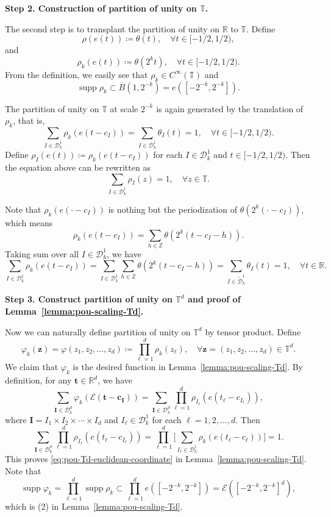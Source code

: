 \documentclass[12pt]{amsart}
\theoremstyle{definition}
\theoremstyle{remark}
\newcommand{\bt}{\boldsymbol{t}}
\newcommand{\bz}{\boldsymbol{z}}
\newcommand{\R}{\mathbb{R}}
\newcommand{\Z}{\mathbb{Z}}
\newcommand{\T}{\mathbb{T}}
\newcommand{\supp}{\operatorname{supp}}
\numberwithin{equation}{section}
\begin{document}
\medskip
{\flushleft \bf Step 2. Construction of partition of unity on $\T$.}
\medskip

The second step is to transplant the partition of unity on $\R$ to $\T$. Define 
\[
\rho(e(t))\coloneq \theta(t),\quad \forall t\in [-1/2,1/2),
\]
and
\[
\rho_k(e(t))\coloneq \theta(2^k t),\quad \forall t\in [-1/2,1/2).
\]
From the definition, we easily see that $\rho_k\in C^\infty(\T)$ and
\[
\supp \rho_k\subset \overline{B}(1,2^{-k})=e([-2^{-k},2^{-k}]).
\]

The partition of unity on $\T$ at scale $2^{-k}$ is again generated by the translation of $\rho_k$, that is,
\[
\sum_{I\in \mathscr{D}_k^1} \rho_k(e(t-c_I))=\sum_{I\in \mathscr{D}_k^1} \theta_{I}(t)=1,\quad \forall t\in [-1/2,1/2).
\]
Define $\rho_{I}(e(t))\coloneq \rho_k(e(t-c_{I}))$ for each $I\in \mathscr{D}_k^1$ and $t\in [-1/2,1/2)$. Then the equation above can be rewritten as
\[
\sum_{I\in \mathscr{D}_k^1} \rho_{I}(z)=1,\quad \forall z\in \T.
\]

Note that $\rho_k(e(\cdot-c_I))$ is nothing but the periodization of $\theta(2^k(\cdot -c_I))$, which means
\[
\rho_k(e(t-c_I))=\sum_{h\in \Z} \theta(2^k(t-c_I-h)).
\]
Taking sum over all $I\in \mathscr{D}_k^1$, we have
\[
\sum_{I\in \mathscr{D}_k^1} \rho_k(e(t-c_I))=\sum_{I\in \mathscr{D}_k^1}\sum_{h\in \Z} \theta(2^k(t-c_I-h))=\sum_{I\in \widetilde{\mathscr{D}}_k^1} \theta_I(t)=1,\quad \forall t\in \R.
\]

\medskip
{\flushleft \bf Step 3. Construct partition of unity on $\T^d$ and proof of Lemma~\ref{lemma:pou-scaling-Td}.}
\medskip

Now we can naturally define partition of unity on $\T^d$ by tensor product. Define 
\[
\varphi_k(\bz)=\varphi(z_1,z_2,\ldots,z_d)\coloneq \prod_{\ell=1}^d\rho_k(z_\ell),\quad \forall \bz=(z_1,z_2,\ldots,z_d)\in \T^d.
\]
We claim that $\varphi_k$ is the desired function in Lemma~\ref{lemma:pou-scaling-Td}. By definition, for any $\bt\in \R^d$, we have
\[
\sum_{\boldsymbol{I}\in \mathscr{D}_k^d} \varphi_{k}(\mathcal{E}(\bt-\boldsymbol{c}_{\boldsymbol{I}}))=\sum_{\boldsymbol{I}\in \mathscr{D}_k^d} \prod_{\ell=1}^d \rho_{I_\ell}(e(t_\ell-c_{I_\ell})),
\]
where $\boldsymbol{I}=I_1\times I_2\times\cdots \times I_d$ and $I_\ell\in \mathscr{D}_k^1$ for each $\ell=1,2,\ldots,d$. Then
\[
\sum_{\boldsymbol{I} \in \mathscr{D}_k^d} \prod_{\ell=1}^d \rho_{I_\ell}(e(t_\ell-c_{I_\ell}))=\prod_{\ell=1}^d \bigg[\sum_{I_\ell \in \mathscr{D}_k^1} \rho_{k}(e(t_\ell-c_\ell))\bigg]=1.
\]
This proves \eqref{eq:pou-Td-euclidean-coordinate} in Lemma~\ref{lemma:pou-scaling-Td}. Note that
\[
\supp \varphi_k=\prod_{\ell=1}^d \supp \rho_k\subset \prod_{\ell=1}^d e([-2^{-k},2^{-k}])=\mathcal{E}([-2^{-k},2^{-k}]^d),
\]
which is (2) in Lemma~\ref{lemma:pou-scaling-Td}.
\end{document}
